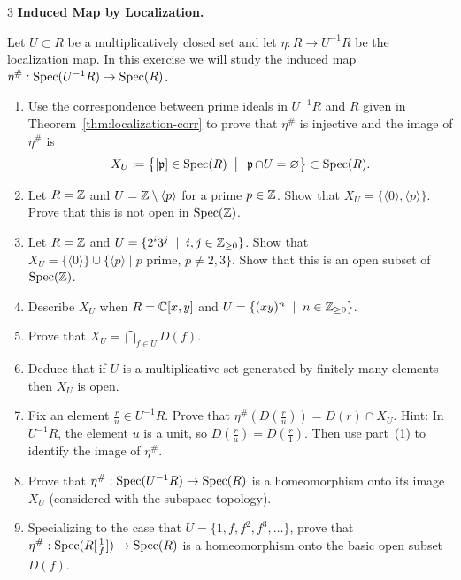 \documentclass[Notebook.tex]{subfiles}
\begin{document}
\begin{problem}{3}
    \textbf{Induced Map by Localization.}  
    
    Let $U\subset R$ be a multiplicatively closed set and let $\eta:R\to U^{-1}R$ be the localization map. In this exercise we will study the induced map $\eta^{\#}:\operatorname{Spec}(U^{-1}R) \to \operatorname{Spec}(R)$. 
    \begin{enumerate}
        \item Use the correspondence between prime ideals in $U^{-1}R$ and $R$ given in Theorem~\ref{thm:localization-corr} to prove that $\eta^{\#}$ is injective and the image of $\eta^{\#}$ is
        \[
        X_{U} \coloneqq \left\{[\operatorname{\mathfrak{p}}] \in \operatorname{Spec}(R) \;\; \big| \;\; \operatorname{\mathfrak{p}} \cap U = \varnothing\right\} \subset \operatorname{Spec}(R).
        \]
        \item Let $R=\mathbb Z$ and $U=\mathbb Z\setminus \langle p \rangle$ for a prime $p\in \mathbb Z$. Show that $X_U=\{\langle 0 \rangle, \langle p \rangle\}$.  Prove that this is not open in $\operatorname{Spec}(\mathbb Z)$.
        \item Let $R=\mathbb Z$ and $U=\{2^{i}3^{j} \;\; | \;\;  i,j\in \mathbb Z_{\geq0}\}$. Show that $X_{U}=\{\langle 0\rangle\} \cup \{\langle p \rangle \; | \; \text{$p$ prime,  $p\neq2,3$}\}$. Show that this is an open subset of  $\operatorname{Spec}(\mathbb{Z})$.
        \item Describe $X_U$ when $R=\mathbb C[x,y]$ and $U=\{(xy)^n \;\; | \; \;  n\in\mathbb Z_{\geq0}\}$.
        \item Prove that $X_{U} = \bigcap_{f \in U} D(f)$. 
        \item Deduce that if $U$ is a multiplicative set generated by finitely many elements then $X_{U}$ is open. 
        \item Fix an element $\frac{r}{u} \in U^{-1}R$. Prove that $\eta^{\#}(D(\frac{r}{u})) = D(r) \cap X_{U}$. Hint: In $U^{-1}R$, the element $u$ is a unit, so $D(\frac{r}{u})=D(\frac{r}{1})$. Then use part~(1) to identify the image of $\eta^{\#}$.
        \item Prove that $\eta^{\#}:\operatorname{Spec}(U^{-1}R) \to \operatorname{Spec}(R)$ is a homeomorphism onto its image $X_{U}$ (considered with the subspace topology). 
        \item Specializing to the case that $U=\{1,f,f^2,f^3,\ldots\}$, prove that $\eta^{\#}:\operatorname{Spec}(R[\frac{1}{f}]) \to \operatorname{Spec}(R)$ is a homeomorphism onto the basic open subset $D(f)$.
    \end{enumerate}
\end{problem}
\end{document}
